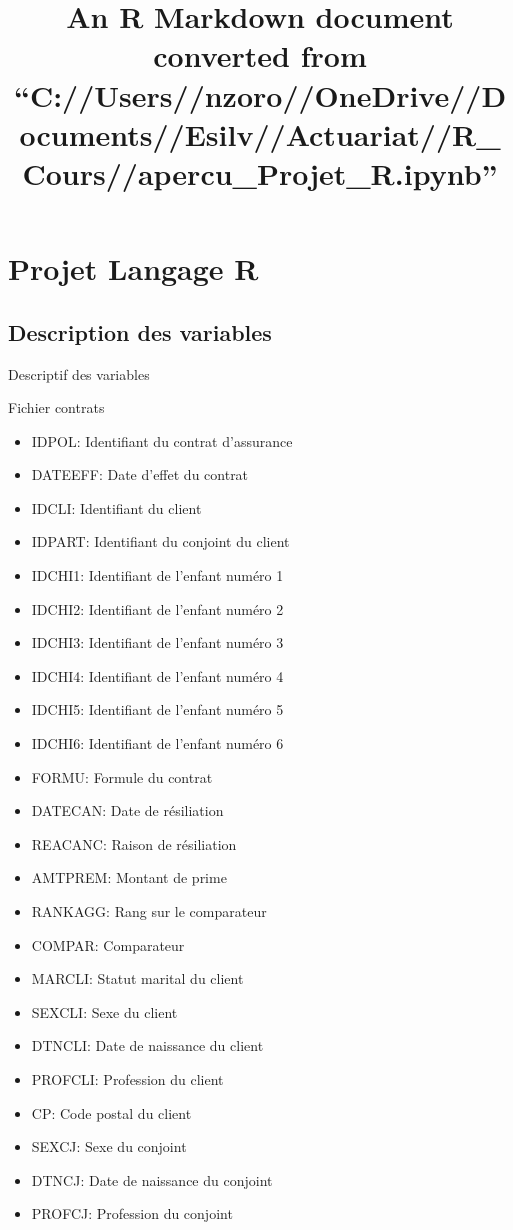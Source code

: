 \documentclass[
]{article}
\title{An R Markdown document converted from
``C://Users//nzoro//OneDrive//Documents//Esilv//Actuariat//R\_Cours//apercu\_Projet\_R.ipynb''}
\author{}
\date{\vspace{-2.5em}}
\begin{document}
\maketitle

\hypertarget{projet-langage-r}{%
\section{\texorpdfstring{\textbf{Projet Langage
R}}{Projet Langage R}}\label{projet-langage-r}}

\hypertarget{description-des-variables}{%
\subsection{Description des variables}\label{description-des-variables}}

Descriptif des variables

Fichier contrats

\begin{itemize}
\item
  IDPOL: Identifiant du contrat d'assurance
\item
  DATEEFF: Date d'effet du contrat
\item
  IDCLI: Identifiant du client
\item
  IDPART: Identifiant du conjoint du client
\item
  IDCHI1: Identifiant de l'enfant numéro 1
\item
  IDCHI2: Identifiant de l'enfant numéro 2
\item
  IDCHI3: Identifiant de l'enfant numéro 3
\item
  IDCHI4: Identifiant de l'enfant numéro 4
\item
  IDCHI5: Identifiant de l'enfant numéro 5
\item
  IDCHI6: Identifiant de l'enfant numéro 6
\item
  FORMU: Formule du contrat
\item
  DATECAN: Date de résiliation
\item
  REACANC: Raison de résiliation
\item
  AMTPREM: Montant de prime
\item
  RANKAGG: Rang sur le comparateur
\item
  COMPAR: Comparateur
\item
  MARCLI: Statut marital du client
\item
  SEXCLI: Sexe du client
\item
  DTNCLI: Date de naissance du client
\item
  PROFCLI: Profession du client
\item
  CP: Code postal du client
\item
  SEXCJ: Sexe du conjoint
\item
  DTNCJ: Date de naissance du conjoint
\item
  PROFCJ: Profession du conjoint
\end{itemize}
\end{document}
